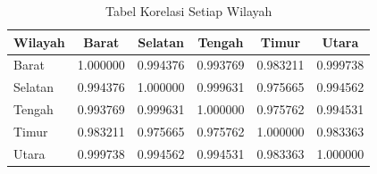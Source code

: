 \begin{table}[H]
\centering
\caption{Tabel Korelasi Setiap Wilayah}
\label{table:korelasi-setiap-wilayah}
\begin{tabular}{lccccc}
\hline
\textbf{Wilayah} & \textbf{Barat} & \textbf{Selatan} & \textbf{Tengah} & \textbf{Timur} & \textbf{Utara} \\
\hline
Barat   & 1.000000 & 0.994376 & 0.993769 & 0.983211 & 0.999738 \\
Selatan & 0.994376 & 1.000000 & 0.999631 & 0.975665 & 0.994562 \\
Tengah  & 0.993769 & 0.999631 & 1.000000 & 0.975762 & 0.994531 \\
Timur   & 0.983211 & 0.975665 & 0.975762 & 1.000000 & 0.983363 \\
Utara   & 0.999738 & 0.994562 & 0.994531 & 0.983363 & 1.000000 \\
\hline
\end{tabular}
\end{table}
